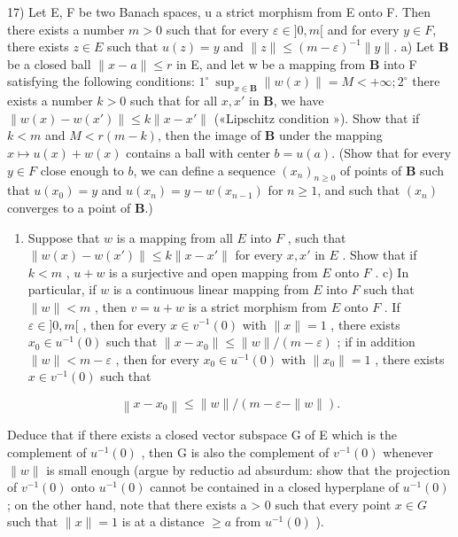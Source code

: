 17) Let E, F be two Banach spaces, u a strict morphism from E onto F. Then there exists
a number \(m > 0\) such that for every \(\varepsilon \in ]0, m[\) and for every \(y \in F\), there exists \(z \in E\) such
that \(u(z) = y\) and \(\| z \| \leqslant (m - \varepsilon)^{-1} \| y \|\).
a) Let \(\mathbf{B}\) be a closed ball \(\| x - a \| \leqslant r\) in E, and let w be a mapping from \(\mathbf{B}\) into F satisfying
the following conditions: \(1^{\circ}\ \sup_{x \in \mathbf{B}} \| w(x) \| = M < +\infty; 2^{\circ}\) there exists a number \(k > 0\)
such that for all \(x, x'\) in \(\mathbf{B}\), we have \(\| w(x) - w(x') \| \leqslant k \| x - x' \|\) («Lipschitz condition »). Show that if \(k < m\) and \(M < r(m - k)\), then the image of \(\mathbf{B}\) under the mapping \(x \mapsto u(x) + w(x)\)
contains a ball with center \(b = u(a)\). (Show that for every \(y \in F\) close enough to \(b\), we can define
a sequence \((x_n)_{n \geqslant 0}\) of points of \(\mathbf{B}\) such that \(u(x_0) = y\) and \(u(x_n) = y - w(x_{n-1})\) for \(n \geqslant 1\),
and such that \((x_n)\) converges to a point of \(\mathbf{B}\).)


\begin{enumerate}
\def\labelenumi{\alph{enumi})}
\setcounter{enumi}{1}
\tightlist
\item
  Suppose that \(w\) is a mapping from all \(E\) into \(F\) , such that \(\| w(x) - w(x') \| \leqslant k \| x - x' \|\) for every \(x, x'\) in \(E\) . Show that if \(k < m\) , \(u + w\) is a surjective and open mapping from \(E\) onto \(F\) . c) In particular, if \(w\) is a continuous linear mapping from \(E\) into \(F\) such that \(\| w \| < m\) , then \(v = u + w\) is a strict morphism from \(E\) onto \(F\) . If \(\varepsilon \in ]0, m[\) , then for every \(x \in v^{-1}(0)\) with \(\| x \| = 1\) , there exists \(x_0 \in u^{-1}(0)\) such that \(\| x - x_0 \| \leqslant \| w \| / (m - \varepsilon)\) ; if in addition \(\| w \| < m - \varepsilon\) , then for every \(x_0 \in u^{-1}(0)\) with \(\| x_0 \| = 1\) , there exists \(x \in v^{-1}(0)\) such that
\end{enumerate}

\[
\left\| x - x _ {0} \right\| \leqslant \| w \| / (m - \varepsilon - \| w \|).
\]

Deduce that if there exists a closed vector subspace G of E which is the complement of \(u^{-1}(0)\) , then G is also the complement of \(v^{-1}(0)\) whenever \(\|w\|\) is small enough (argue by reductio ad absurdum: show that the projection of \(v^{-1}(0)\) onto \(u^{-1}(0)\) cannot be contained in a closed hyperplane of \(u^{-1}(0)\) ; on the other hand, note that there exists a > 0 such that every point \(x \in G\) such that \(\|x\| = 1\) is at a distance \(\geqslant a\) from \(u^{-1}(0)\) ).

